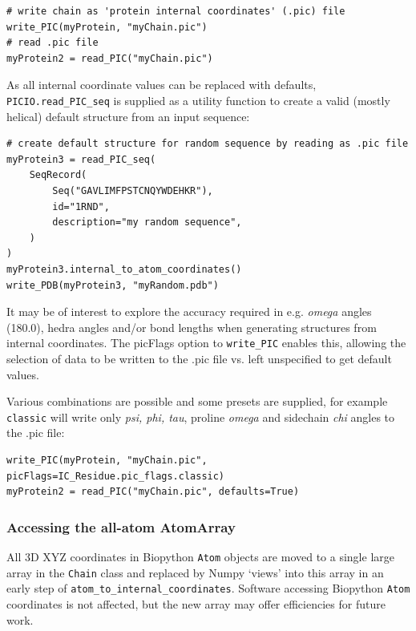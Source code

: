 \begin{verbatim}
# write chain as 'protein internal coordinates' (.pic) file
write_PIC(myProtein, "myChain.pic")
# read .pic file
myProtein2 = read_PIC("myChain.pic")
\end{verbatim}

As all internal coordinate values can be replaced with defaults, \texttt{PICIO.read\_PIC\_seq\(\)} is
supplied as a utility function to create a valid (mostly helical) default structure from an input
sequence:

\begin{verbatim}
# create default structure for random sequence by reading as .pic file
myProtein3 = read_PIC_seq(
    SeqRecord(
        Seq("GAVLIMFPSTCNQYWDEHKR"),
        id="1RND",
        description="my random sequence",
    )
)
myProtein3.internal_to_atom_coordinates()
write_PDB(myProtein3, "myRandom.pdb")
\end{verbatim}

It may be of interest to explore the accuracy required in e.g. \textit{omega} angles (180.0), hedra angles
and/or bond lengths when generating structures from internal coordinates.  The picFlags
option to \texttt{write\_PIC\(\)} enables this, allowing the selection of data to be written
to the .pic file vs. left unspecified to get default values.

Various combinations are possible and some presets are supplied, for example \texttt{classic}
will write only \textit{psi, phi, tau}, proline \textit{omega} and sidechain \textit{chi}
angles to the .pic file:

\begin{verbatim}
write_PIC(myProtein, "myChain.pic", picFlags=IC_Residue.pic_flags.classic)
myProtein2 = read_PIC("myChain.pic", defaults=True)
\end{verbatim}

\subsubsection{Accessing the all-atom AtomArray}

All 3D XYZ coordinates in Biopython \texttt{Atom} objects are moved to a single large array
in the \texttt{Chain} class and replaced by Numpy `views' into this array in an early step of
\texttt{atom\_to\_internal\_coordinates\(\)}.  Software accessing Biopython \texttt{Atom} coordinates
is not affected, but the new array may offer efficiencies for future work.

